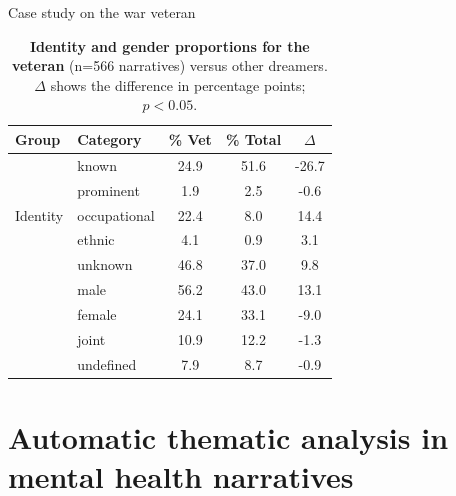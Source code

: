 \documentclass[handout,10pt]{beamer}
\begin{document}
\begin{frame}{Case study on the war veteran}
  \begin{table}
    \centering
    \begin{tabular}{llccc}
\textbf{Group} & \textbf{Category} & \textbf{\% Vet} & \textbf{\% Total} & \textbf{$\Delta$} \\
\midrule
\multirow{5}{*}{Identity} & known & 24.9 & 51.6 & \textcolor{bluepanam}{-26.7} \\
& prominent & 1.9 & 2.5 & -0.6 \\
& occupational & 22.4 & 8.0 & \textcolor{bluepanam}{14.4} \\
& ethnic & 4.1 & 0.9 & \textcolor{bluepanam}{3.1} \\
& unknown & 46.8 & 37.0 & \textcolor{bluepanam}{9.8} \\
\addlinespace
\multirow{4}{*}{Gender} & male & 56.2 & 43.0 & \textcolor{bluepanam}{13.1} \\
& female & 24.1 & 33.1 & \textcolor{bluepanam}{-9.0} \\
& joint & 10.9 & 12.2 & -1.3 \\
& undefined & 7.9 & 8.7 & -0.9 \\
\end{tabular}
\caption{\textbf{Identity and gender proportions for the veteran} (n=566 narratives) versus other dreamers. \scriptsize{$\Delta$ shows the difference in percentage points; \textcolor{bluepanam}{$p<0.05$}.}}
\label{tab:case_study_war_veteran}
\end{table}

\vspace{-0.5cm}


\vspace{0.25cm}


\end{frame}

\section{Automatic thematic analysis in mental health narratives}
\end{document}

